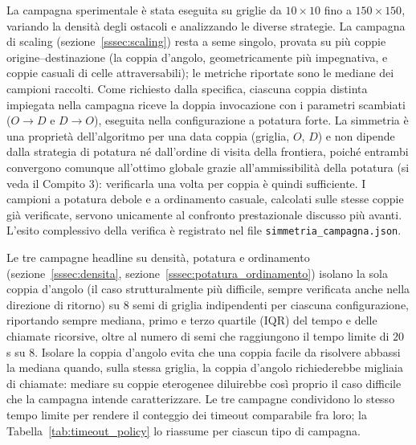 La campagna sperimentale è stata eseguita su griglie da $10 \times 10$ fino a $150 \times 150$, variando la densità degli ostacoli e analizzando le diverse strategie. La campagna di scaling (sezione~\ref{sssec:scaling}) resta a seme singolo, provata su più coppie origine--destinazione (la coppia d'angolo, geometricamente più impegnativa, e coppie casuali di celle attraversabili); le metriche riportate sono le mediane dei campioni raccolti. Come richiesto dalla specifica, ciascuna coppia distinta impiegata nella campagna riceve la doppia invocazione con i parametri scambiati ($O \rightarrow D$ e $D \rightarrow O$), eseguita nella configurazione a potatura forte. La simmetria è una proprietà dell'algoritmo per una data coppia (griglia, $O$, $D$) e non dipende dalla strategia di potatura né dall'ordine di visita della frontiera, poiché entrambi convergono comunque all'ottimo globale grazie all'ammissibilità della potatura (si veda il Compito 3): verificarla una volta per coppia è quindi sufficiente. I campioni a potatura debole e a ordinamento casuale, calcolati sulle stesse coppie già verificate, servono unicamente al confronto prestazionale discusso più avanti. L'esito complessivo della verifica è registrato nel file \texttt{simmetria\_campagna.json}.

Le tre campagne headline su densità, potatura e ordinamento (sezione~\ref{sssec:densita}, sezione~\ref{sssec:potatura_ordinamento}) isolano la sola coppia d'angolo (il caso strutturalmente più difficile, sempre verificata anche nella direzione di ritorno) su $8$ semi di griglia indipendenti per ciascuna configurazione, riportando sempre mediana, primo e terzo quartile (IQR) del tempo e delle chiamate ricorsive, oltre al numero di semi che raggiungono il tempo limite di $20$ s su $8$. Isolare la coppia d'angolo evita che una coppia facile da risolvere abbassi la mediana quando, sulla stessa griglia, la coppia d'angolo richiederebbe migliaia di chiamate: mediare su coppie eterogenee diluirebbe così proprio il caso difficile che la campagna intende caratterizzare. Le tre campagne condividono lo stesso tempo limite per rendere il conteggio dei timeout comparabile fra loro; la Tabella~\ref{tab:timeout_policy} lo riassume per ciascun tipo di campagna.

